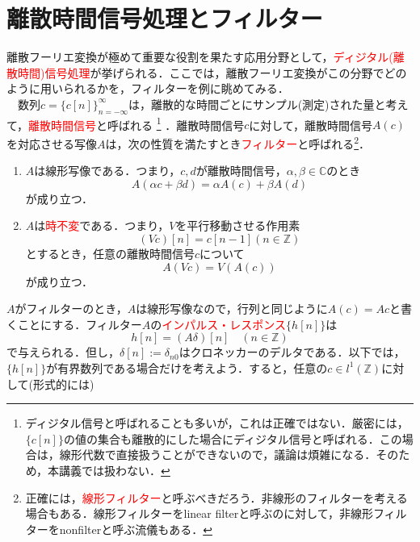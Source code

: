 \documentclass[a4j]{jsbook}
\numberwithin{theorem}{chapter}  %
\begin{document}
\section{離散時間信号処理とフィルター} \label{sec2-7}
離散フーリエ変換が極めて重要な役割を果たす応用分野として，\textcolor{red}{ディジタル(離散時間)信号処理}が挙げられる．ここでは，離散フーリエ変換がこの分野でどのように用いられるかを，フィルターを例に眺めてみる．\\
　数列\(c=\{c[n]\}_{n=-\infty}^\infty\)は，離散的な時間ごとにサンプル(測定)された量と考えて，\textcolor{red}{離散時間信号}と呼ばれる
\footnote{ディジタル信号と呼ばれることも多いが，これは正確ではない．厳密には，\(\{c[n]\}\)の値の集合も離散的にした場合にディジタル信号と呼ばれる．この場合は，線形代数で直接扱うことができないので，議論は煩雑になる．そのため，本講義では扱わない．
}
．離散時間信号\(c\)に対して，離散時間信号\(A(c)\)を対応させる写像\(A\)は，次の性質を満たすとき\textcolor{red}{フィルター}と呼ばれる\footnote{正確には，\textcolor{red}{線形フィルター}と呼ぶべきだろう．非線形のフィルターを考える場合もある．線形フィルターをlinear filterと呼ぶのに対して，非線形フィルターをnonfilterと呼ぶ流儀もある．}．
\begin{enumerate}
    \renewcommand{\labelenumi}{\arabic{enumi})}
    \item \(A\)は線形写像である．つまり，\(c, d\)が離散時間信号，\(\alpha, \beta\in\mathbb{C}\)のとき
    \begin{equation*}
        A(\alpha c+\beta d)=\alpha A(c)+\beta A(d)
    \end{equation*}
    が成り立つ．
    \item \(A\)は\textcolor{red}{時不変}である．つまり，\(V\)を平行移動させる作用素
    \begin{equation*}
        (Vc)[n]=c[n-1] (n\in\mathbb{Z})
    \end{equation*}
    とするとき，任意の離散時間信号\(c\)について
    \begin{equation*}
        A(Vc)=V(A(c))
    \end{equation*}
    が成り立つ．
\end{enumerate}
\(A\)がフィルターのとき，\(A\)は線形写像なので，行列と同じように\(A(c)=Ac\)と書くことにする．フィルター\(A\)の\textcolor{red}{インパルス・レスポンス}\(\{h[n]\}\)は
\begin{equation*}
    h[n]=(A\delta)[n]\quad (n\in\mathbb{Z})
\end{equation*}
で与えられる．但し，\(\delta[n]:=\delta_{n0}\)はクロネッカーのデルタである．以下では，\(\{h[n]\}\)が有界数列である場合だけを考えよう．すると，任意の\(c\in l^1(\mathbb{Z})\)に対して(形式的には)
\end{document}
